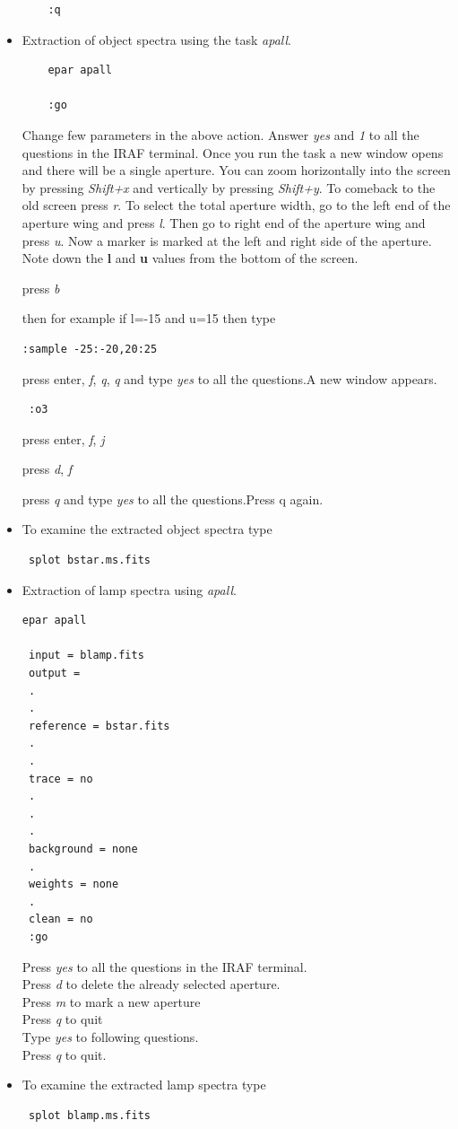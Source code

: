 \documentclass[letterpaper,11pt]{report}
\begin{document}
\begin{itemize}
\begin{lstlisting}
    :q
     \end{lstlisting}
    \item  Extraction of object spectra using the task \emph{apall}.
    \begin{lstlisting}
    epar apall
    
    :go
     \end{lstlisting}
     Change few parameters in the above action. Answer \emph{yes} and \emph{1} to all the questions in the IRAF terminal. Once you run the task a new  window opens and there will be a single aperture. You can zoom horizontally into the screen by  pressing \emph{Shift+x} and vertically by pressing \emph{Shift+y}. To comeback to the old screen press \emph{r}.
To select the total aperture width, go to the left end of the aperture wing and press \emph{l}. Then go to right end of the aperture wing and press \emph{u}. Now a marker is marked at the left and right side of the aperture. Note down the \textbf{l} and \textbf{u} values from the bottom of the screen.  

press \emph{b}

then for example if l=-15 and u=15 then type
\begin{lstlisting}
:sample -25:-20,20:25
 \end{lstlisting}
 press enter, \emph{f}, \emph{q}, \emph{q} and type \emph{yes} to all the questions.A new window appears.
 \begin{lstlisting}
 :o3
  \end{lstlisting}
 press enter, \emph{f}, \emph{j}
 
 press \emph{d}, \emph{f}
 
 press \emph{q} and type \emph{yes} to all the questions.Press q again.
 \item To examine the extracted object spectra type  
 \begin{lstlisting}
 splot bstar.ms.fits 
  \end{lstlisting}
\item  Extraction of lamp spectra using \emph{apall}.
\begin{lstlisting}
epar apall

 input = blamp.fits  
 output =
 .  
 .  
 reference = bstar.fits  
 .  
 .  
 trace = no  
 .  
 .  
 .  
 background = none   
 . 
 weights = none  
 . 
 clean = no  
 :go 
  \end{lstlisting}
 Press \emph{yes} to all the questions in the IRAF terminal. \\ 
 Press \emph{d} to delete the already selected aperture.  \\
 Press \emph{m} to mark a new aperture  \\
 Press \emph{q} to quit  \\
 Type \emph{yes} to following questions. \\
 Press \emph{q} to quit.\\
 \item  To examine the extracted lamp spectra type
 \begin{lstlisting}
 splot blamp.ms.fits 
  \end{lstlisting}
\end{itemize}
\end{document}
